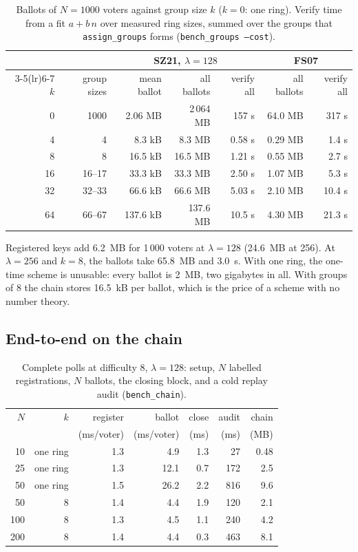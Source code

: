\documentclass[11pt,a4paper]{article}
\theoremstyle{definition}
\begin{document}
\begin{table}[h]
\centering
\caption{Ballots of $N = 1000$ voters against group size $k$ ($k = 0$:
one ring). Verify time from a fit $a + b\,n$ over measured ring sizes,
summed over the groups that \texttt{assign\_groups} forms
(\texttt{bench\_groups --cost}).}
\label{tab:groupcost}
\small
\begin{tabular}{r r rrr rr}
\toprule
& & \multicolumn{3}{c}{SZ21, $\lambda = 128$} & \multicolumn{2}{c}{FS07} \\
\cmidrule(lr){3-5}\cmidrule(lr){6-7}
$k$ & group sizes & mean ballot & all ballots & verify all & all ballots & verify all \\
\midrule
0  & 1000   & 2.06 MB  & 2\,064 MB & 157 s  & 64.0 MB & 317 s \\
4  & 4      & 8.3 kB   & 8.3 MB    & 0.58 s & 0.29 MB & 1.4 s \\
8  & 8      & 16.5 kB  & 16.5 MB   & 1.21 s & 0.55 MB & 2.7 s \\
16 & 16--17 & 33.3 kB  & 33.3 MB   & 2.50 s & 1.07 MB & 5.3 s \\
32 & 32--33 & 66.6 kB  & 66.6 MB   & 5.03 s & 2.10 MB & 10.4 s \\
64 & 66--67 & 137.6 kB & 137.6 MB  & 10.5 s & 4.30 MB & 21.3 s \\
\bottomrule
\end{tabular}
\end{table}

Registered keys add 6.2~MB for 1\,000 voters at $\lambda = 128$
(24.6~MB at 256). At $\lambda = 256$ and $k = 8$, the ballots take
65.8~MB and 3.0~s. With one ring, the one-time scheme is unusable: every
ballot is 2~MB, two gigabytes in all. With groups of 8 the chain stores
16.5~kB per ballot, which is the price of a scheme with no number theory.

\subsection{End-to-end on the chain}

\begin{table}[h]
\centering
\caption{Complete polls at difficulty 8, $\lambda = 128$: setup, $N$
labelled registrations, $N$ ballots, the closing block, and a cold replay
audit (\texttt{bench\_chain}).}
\label{tab:e2e}
\small
\begin{tabular}{rrrrrrr}
\toprule
$N$ & $k$ & register & ballot & close & audit & chain \\
    &     & (ms/voter) & (ms/voter) & (ms) & (ms) & (MB) \\
\midrule
10  & one ring & 1.3 & 4.9  & 1.3 & 27   & 0.48 \\
25  & one ring & 1.3 & 12.1 & 0.7 & 172  & 2.5 \\
50  & one ring & 1.5 & 26.2 & 2.2 & 816  & 9.6 \\
50  & 8        & 1.4 & 4.4  & 1.9 & 120  & 2.1 \\
100 & 8        & 1.3 & 4.5  & 1.1 & 240  & 4.2 \\
200 & 8        & 1.4 & 4.4  & 0.3 & 463  & 8.1 \\
\bottomrule
\end{tabular}
\end{table}
\end{document}
